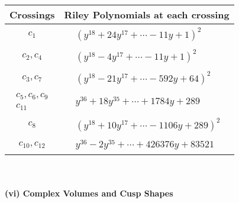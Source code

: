 \documentclass[1p]{elsarticle_modified}
\theoremstyle{definition}
\begin{document}
\begin{tabular}{m{50pt}|m{274pt}}
Crossings & \hspace{64pt}Riley Polynomials at each crossing \\
\hline $$\begin{aligned}c_{1}\end{aligned}$$&$\begin{aligned}
&(y^{18}+24 y^{17}+\cdots-11 y+1)^{2}
\end{aligned}$\\
\hline $$\begin{aligned}c_{2},c_{4}\end{aligned}$$&$\begin{aligned}
&(y^{18}-4 y^{17}+\cdots-11 y+1)^{2}
\end{aligned}$\\
\hline $$\begin{aligned}c_{3},c_{7}\end{aligned}$$&$\begin{aligned}
&(y^{18}-21 y^{17}+\cdots-592 y+64)^{2}
\end{aligned}$\\
\hline $$\begin{aligned}c_{5},c_{6},c_{9}\\c_{11}\end{aligned}$$&$\begin{aligned}
&y^{36}+18 y^{35}+\cdots+1784 y+289
\end{aligned}$\\
\hline $$\begin{aligned}c_{8}\end{aligned}$$&$\begin{aligned}
&(y^{18}+10 y^{17}+\cdots-1106 y+289)^{2}
\end{aligned}$\\
\hline $$\begin{aligned}c_{10},c_{12}\end{aligned}$$&$\begin{aligned}
&y^{36}-2 y^{35}+\cdots+426376 y+83521
\end{aligned}$\\
\hline
\end{tabular}\\~\\
\newpage\flushleft \textbf{(vi) Complex Volumes and Cusp Shapes}
\end{document}
